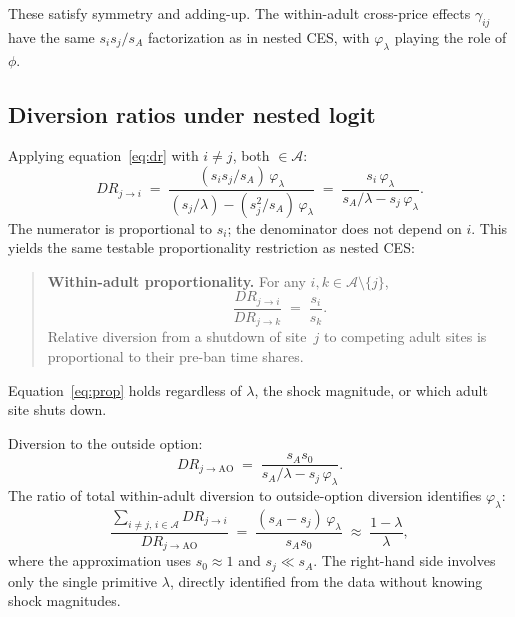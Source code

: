 \documentclass{article}
\begin{document}
\medskip\noindent These satisfy symmetry and adding-up.  The within-adult
cross-price effects $\gamma_{ij}$ have the same $s_i s_j / s_A$ factorization
as in nested CES, with $\varphi_\lambda$ playing the role of $\phi$.

\subsection{Diversion ratios under nested logit}

Applying equation~\eqref{eq:dr} with $i \neq j$, both $\in \mathcal{A}$:
\begin{equation}\label{eq:dr_nl}
  DR_{j \to i} \;=\;
  \frac{(s_i s_j / s_A)\,\varphi_\lambda}
       {(s_j/\lambda) - (s_j^2/s_A)\,\varphi_\lambda}
  \;=\;
  \frac{s_i\,\varphi_\lambda}
       {s_A/\lambda - s_j\,\varphi_\lambda}.
\end{equation}
The numerator is proportional to $s_i$; the denominator does not depend on
$i$.  This yields the same testable proportionality restriction as nested CES:

\medskip
\begin{quote}
  \textbf{Within-adult proportionality.}
  For any $i, k \in \mathcal{A} \setminus \{j\}$,
  \begin{equation}\label{eq:prop}
    \frac{DR_{j \to i}}{DR_{j \to k}} \;=\; \frac{s_i}{s_k}.
  \end{equation}
  Relative diversion from a shutdown of site~$j$ to competing adult sites
  is proportional to their pre-ban time shares.
\end{quote}

\medskip\noindent Equation~\eqref{eq:prop} holds regardless of $\lambda$,
the shock magnitude, or which adult site shuts down.

Diversion to the outside option:
\begin{equation}
  DR_{j \to \mathrm{AO}} \;=\;
  \frac{s_A s_0}{s_A/\lambda - s_j\,\varphi_\lambda}.
\end{equation}
The ratio of total within-adult diversion to outside-option diversion
identifies $\varphi_\lambda$:
\begin{equation}\label{eq:ratio}
  \frac{\displaystyle\sum_{i \neq j,\,i \in \mathcal{A}} DR_{j \to i}}
       {DR_{j \to \mathrm{AO}}}
  \;=\;
  \frac{(s_A - s_j)\,\varphi_\lambda}{s_A s_0}
  \;\approx\;
  \frac{1 - \lambda}{\lambda},
\end{equation}
where the approximation uses $s_0 \approx 1$ and $s_j \ll s_A$.  The
right-hand side involves only the single primitive $\lambda$, directly
identified from the data without knowing shock magnitudes.
\end{document}
